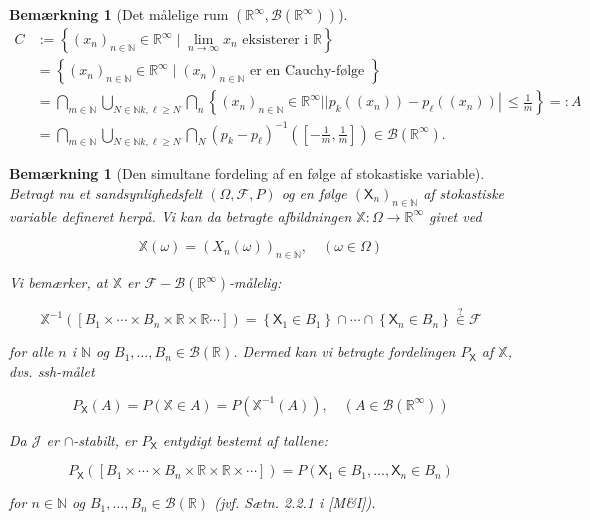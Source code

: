 \documentclass{article}
\newcommand{\R}{\mathbb{R}}
\newcommand{\1}{\mathbbm{1}}
\newcommand{\X}{\mathsf{X}}
\theoremstyle{boxed}
\newtheorem{remark}[theorem]{Bemærkning}
\begin{document}
\begin{remark}[Det målelige rum $(\R^{\infty},\mathcal{B}(\R^{\infty}))$]
$$
\begin{aligned}
C & :=\left\{\left(x_n\right)_{n \in \mathbb{N}} \in \mathbb{R}^{\infty} \mid \lim _{n \rightarrow \infty} x_n \text { eksisterer i } \mathbb{R}\right\} \\
& =\left\{\left(x_n\right)_{n \in \mathbb{N}} \in \mathbb{R}^{\infty} \mid\left(x_n\right)_{n \in \mathbb{N}} \text { er en Cauchy-følge }\right\} \\
& =\bigcap_{m \in \mathbb{N}} \bigcup_{N \in \mathbb{N} k, \ell \geq N} \bigcap_n\left\{\left(x_n\right)_{n \in \mathbb{N}} \in \mathbb{R}^{\infty}| | p_k\left(\left(x_n\right)\right)-p_{\ell}\left(\left(x_n\right)\right) \left\lvert\, \leq \frac{1}{m}\right.\right\}=: A \\
& =\bigcap_{m \in \mathbb{N}} \bigcup_{N \in \mathbb{N} k, \ell \geq N} \bigcap_N\left(p_k-p_{\ell}\right)^{-1}\left(\left[-\frac{1}{m}, \frac{1}{m}\right]\right) \in \mathcal{B}\left(\mathbb{R}^{\infty}\right) .
\end{aligned}
$$
\end{remark}
\begin{remark}[Den simultane fordeling af en følge af stokastiske variable]
    Betragt nu et sandsynlighedsfelt $(\Omega, \mathcal{F}, P)$ og en følge $\left(\X_n\right)_{n \in \mathbb{N}}$ af stokastiske variable defineret herpå.
    Vi kan da betragte afbildningen $\mathbb{X}: \Omega \rightarrow \mathbb{R}^{\infty}$ givet ved
    
    $$
    \mathbb{X}(\omega)=\left(X_n(\omega)\right)_{n \in \mathbb{N}}, \quad(\omega \in \Omega)
    $$
    
    
    Vi bemærker, at $\mathbb{X}$ er $\mathcal{F}-\mathcal{B}\left(\mathbb{R}^{\infty}\right)$-målelig:
    
    $$
    \mathbb{X}^{-1}\left(\left[B_1 \times \cdots \times B_n \times \mathbb{R} \times \mathbb{R} \cdots\right]\right)=\left\{\X_1 \in B_1\right\} \cap \cdots \cap\left\{\X_n \in B_n\right\} \stackrel{?}{\in} \mathcal{F}
    $$
    
    for alle $n$ i $\mathbb{N}$ og $B_1, \ldots, B_n \in \mathcal{B}(\mathbb{R})$.
    Dermed kan vi betragte fordelingen $P_{\X}$ af $\mathbb{X}$, dvs. ssh-målet
    
    $$
    P_{\X}(A)=P(\mathbb{X} \in A)=P\left(\mathbb{X}^{-1}(A)\right), \quad\left(A \in \mathcal{B}\left(\mathbb{R}^{\infty}\right)\right)
    $$
    
    
    Da $\mathcal{J}$ er $\cap$-stabilt, er $P_{\X}$ entydigt bestemt af tallene:
    
    $$
    P_{\X}\left(\left[B_1 \times \cdots \times B_n \times \mathbb{R} \times \mathbb{R} \times \cdots\right]\right)=P\left(\X_1 \in B_1, \ldots, \X_n \in B_n\right)
    $$
    
    for $n \in \mathbb{N}$ og $B_1, \ldots, B_n \in \mathcal{B}(\mathbb{R})$ (jvf. Sætn. 2.2.1 i [M\&I]).
\end{remark}
\end{document}
